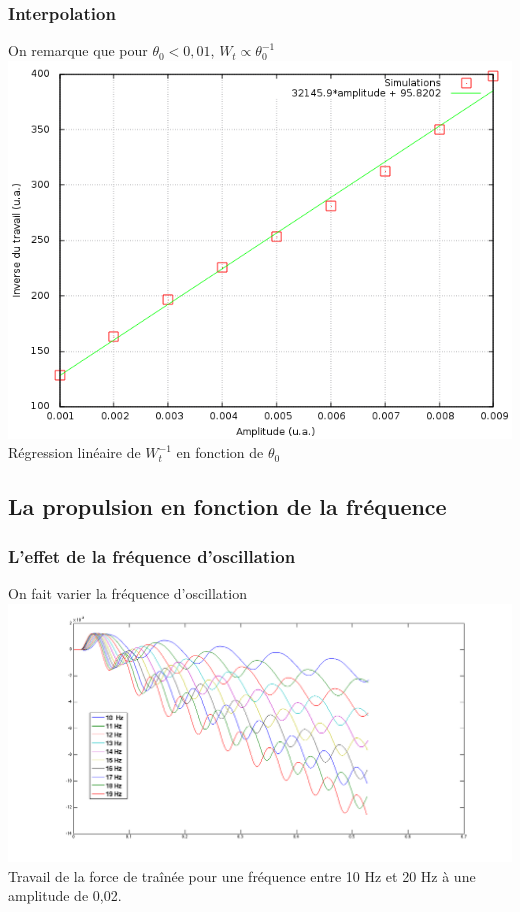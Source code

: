 \documentclass{beamer}
\begin{document}
 \begin{frame}
   \frametitle{Interpolation}
   On remarque que pour $ \theta_0 < 0,01$, $W_t \propto \theta_0^{-1}$
   \centering \includegraphics[width= 0.8 \linewidth]{9_courbes_extraites.png}\\
   Régression linéaire de $W_t^{-1}$ en fonction de $\theta_0$
 \end{frame}

 \subsection{La propulsion en fonction de la fréquence}
 	
 \begin{frame}
   \frametitle{L'effet de la fréquence d'oscillation}
   On fait varier la fréquence d'oscillation
   \centering \includegraphics[width= 0.8 \linewidth]{freq0,02.png}\\
   Travail de la force de traînée pour une fréquence entre 10 Hz et 20
   Hz à une amplitude de 0,02\degre. 
 \end{frame}
 	
\end{document}
